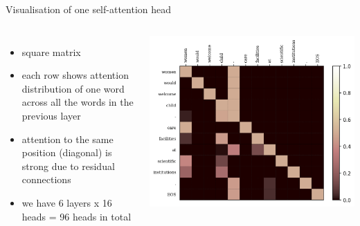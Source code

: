 \documentclass{beamer}
\begin{document}
\begin{frame}{Visualisation of one self-attention head}
    \begin{columns}
            \begin{itemize}
                \item square matrix
                \item each row shows attention distribution of one word across all the words in the previous layer
                \item attention to the same position (diagonal) is strong due to residual connections
                \item we have 6 layers x 16 heads = 96 heads in total
            \end{itemize}
        \begin{centering}
        \includegraphics[scale=0.4]{more_complicated.png}
        \end{centering}
    \end{columns}
\end{frame}
\end{document}
